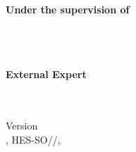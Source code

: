 \begin{titlepage}
\begin{center}
    \begin{minipage}{0.48\textwidth}
        \centering
        {\large \textbf{Under the supervision of}}\\
        {\large \Advisor}\\
        {\large \SAdvisor}\\
        {\small \AdvisorResearchUnit}\\
    \end{minipage}
    \hfill
    \begin{minipage}{0.48\textwidth}
        \centering
        {\large \textbf{External Expert}}\\
        {\large \Expert}\\
    \end{minipage}
    \\[1.5cm]

    \vfill
    {\small Version \version} \\
    {\small \Place, HES-SO//\Diploma, \Date}

\end{center}
\restoregeometry
\end{titlepage}
